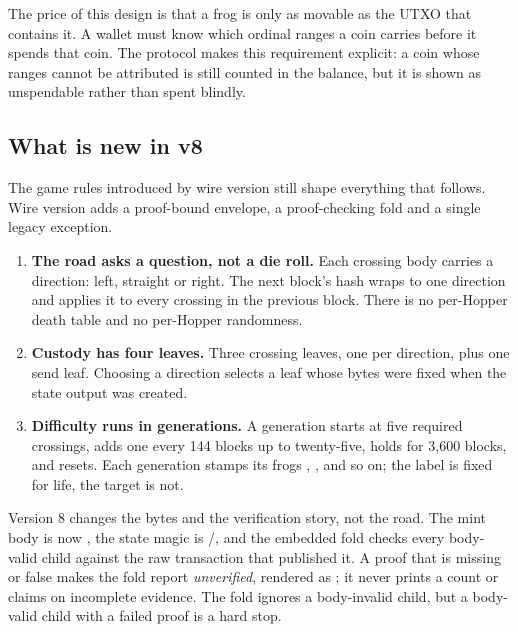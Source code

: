 The price of this design is that a frog is only as movable as the UTXO that
contains it. A wallet must know which ordinal ranges a coin carries before it
spends that coin. The protocol makes this requirement explicit: a coin whose
ranges cannot be attributed is still counted in the balance, but it is shown
as unspendable rather than spent blindly.

\subsection{What is new in v8}

The game rules introduced by wire version  still shape
everything that follows. Wire version  adds a proof-bound
envelope, a proof-checking fold and a single legacy exception.

\begin{enumerate}[leftmargin=1.6em,itemsep=0.3em]
  \item \textbf{The road asks a question, not a die roll.} Each crossing body
        carries a direction: left, straight or right. The next block's hash
        wraps to one direction and applies it to every crossing in the
        previous block. There is no per-Hopper death table and no per-Hopper
        randomness.
  \item \textbf{Custody has four leaves.} Three crossing leaves, one per
        direction, plus one send leaf. Choosing a direction selects a leaf
        whose bytes were fixed when the state output was created.
  \item \textbf{Difficulty runs in generations.} A generation starts at five
        required crossings, adds one every 144 blocks up to twenty-five,
        holds for 3{,}600 blocks, and resets. Each generation stamps its frogs
        , , and so on; the label is fixed for life, the
        target is not.
\end{enumerate}

Version 8 changes the bytes and the verification story, not the road. The
mint body is now , the state magic is
/, and the embedded fold checks every
body-valid child against the raw transaction that published it. A proof that
is missing or false makes the fold report \emph{unverified}, rendered as
 \roadglyph{} \code{---}; it never prints a count or claims
 on incomplete evidence. The fold ignores a body-invalid child,
but a body-valid child with a failed proof is a hard stop.

